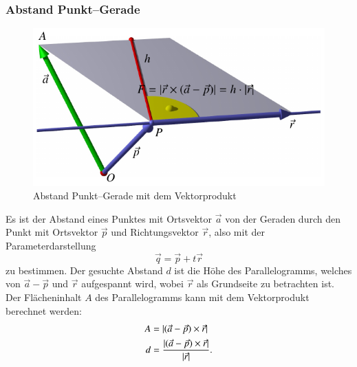 \subsubsection{Abstand Punkt--Gerade}
\begin{figure}
\begin{center}
\includegraphics{5/images/abstand.pdf}
\end{center}
\caption{Abstand Punkt--Gerade mit dem Vektorprodukt\label{punkt-gerade}}
\end{figure}
Es ist der Abstand eines Punktes mit Ortsvektor $\vec a$ von der
Geraden durch den Punkt mit Ortsvektor $\vec p$ und Richtungsvektor $\vec r$,
also mit der Parameterdarstellung
\[
\vec q=\vec p+t\vec r
\]
zu bestimmen.
Der gesuchte Abstand $d$ ist die Höhe des Parallelogramms,
welches von $\vec a-\vec p$
und $\vec r$ aufgespannt wird, wobei $\vec r$ als Grundseite zu betrachten ist.
Der Flächeninhalt $A$ des Parallelogramms kann mit dem Vektorprodukt
berechnet werden:
\begin{align}
A
&=
|(\vec a-\vec p)\times\vec r|
\notag
\\
d
&=
\frac{|(\vec a-\vec p)\times\vec r|}{|\vec r|}.
\label{eqn:abstandpunktgerade}
\end{align}
